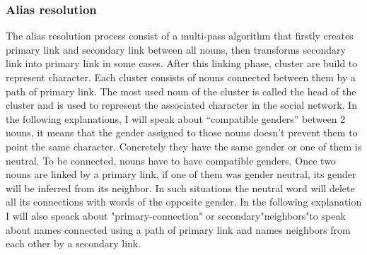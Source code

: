 \documentclass[a4paper, 12pt]{report}
\begin{document}
\subsubsection{Alias resolution}
The alias resolution process consist of a multi-pass algorithm that firstly creates  primary link and secondary link between all  nouns, then  transforms secondary link into  primary link in some cases. After this linking phase, cluster are  build to represent character. Each cluster consists of nouns connected between them by a path of primary link. The most used noun of the cluster is called the head of the cluster and is used to represent the associated character in the social network. In the following explanations, I will speak about ``compatible genders'' between 2 nouns, it means that the gender assigned to those nouns doesn't prevent them to point the same character. Concretely they have the same gender or one of them is neutral. To be connected, nouns have to have compatible genders. Once two nouns are linked by a  primary link, if one of them was gender neutral, its gender will be inferred from its neighbor. In such situations the neutral word will delete all its connections with words of the opposite gender. In the following explanation I will also speack about "primary-connection" or secondary"neighbors"to speak about names connected using a path of primary link and names neighbors from each other by a secondary link. \\
\end{document}
